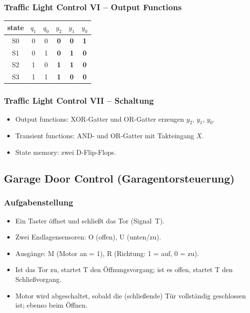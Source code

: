 \documentclass[11pt,a4paper]{article}
\begin{document}
\subsubsection{Traffic Light Control VI -- Output Functions}
\begin{center}
\begin{tabular}{c|cc|ccc}
    \toprule
    state & $q_1$ & $q_0$ & $y_2$ & $y_1$ & $y_0$ \\ \midrule
    S0 & 0 & 0 & \textbf{0} & \textbf{0} & \textbf{1} \\
    S1 & 0 & 1 & \textbf{0} & \textbf{1} & \textbf{0} \\
    S2 & 1 & 0 & \textbf{1} & \textbf{1} & \textbf{0} \\
    S3 & 1 & 1 & \textbf{1} & \textbf{0} & \textbf{0} \\ \bottomrule
\end{tabular}
\end{center}

\subsubsection{Traffic Light Control VII -- Schaltung}
\begin{itemize}
    \item Output functions: XOR-Gatter und OR-Gatter erzeugen $y_2$, $y_1$, $y_0$.
    \item Transient functions: AND- und OR-Gatter mit Takteingang $X$.
    \item State memory: zwei D-Flip-Flops.
\end{itemize}

\subsection{Garage Door Control (Garagentorsteuerung)}

\subsubsection{Aufgabenstellung}
\begin{itemize}
    \item Ein Taster öffnet und schließt das Tor (Signal~T).
    \item Zwei Endlagensensoren: O (offen), U (unten/zu).
    \item Ausgänge: M (Motor an = 1), R (Richtung: 1 = auf, 0 = zu).
    \item Ist das Tor zu, startet T den Öffnungsvorgang; ist es offen, startet T den Schließvorgang.
    \item Motor wird abgeschaltet, sobald die (schließende) Tür vollständig geschlossen ist; ebenso beim Öffnen.
\end{itemize}
\end{document}

